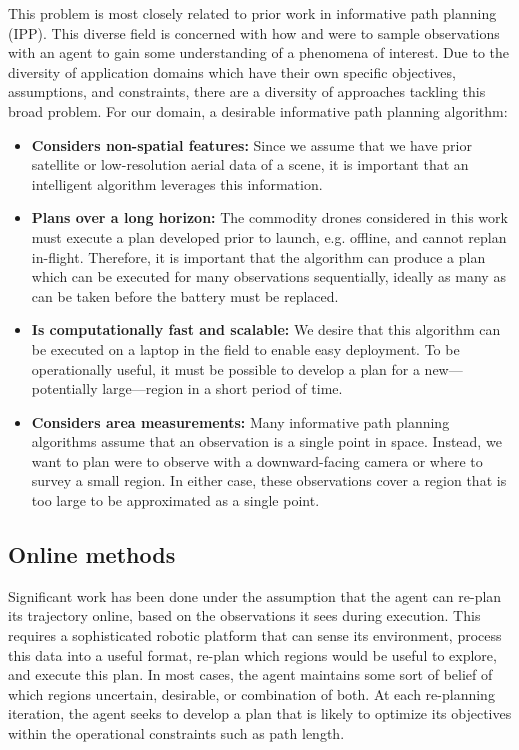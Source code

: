 This problem is most closely related to prior work in informative path planning (IPP). This diverse field is concerned with how and were to sample observations with an agent to gain some understanding of a phenomena of interest. Due to the diversity of application domains which have their own specific objectives, assumptions, and constraints, there are a diversity of approaches tackling this broad problem. For our domain, a desirable informative path planning algorithm:

\begin{itemize}
    \item \textbf{Considers non-spatial features:} Since we assume that we have prior satellite or low-resolution aerial data of a scene, it is important that an intelligent algorithm leverages this information.
    \item \textbf{Plans over a long horizon:} The commodity drones considered in this work must execute a plan developed prior to launch, e.g. offline, and cannot replan in-flight.
    Therefore, it is important that the algorithm can produce a plan which can be executed for many observations sequentially, ideally as many as can be taken before the battery must be replaced. 
    \item \textbf{Is computationally fast and scalable:} We desire that this algorithm can be executed on a laptop in the field to enable easy deployment.
    To be operationally useful, it must be possible to develop a plan for a new---potentially large---region in a short period of time.
    \item \textbf{Considers area measurements:} Many informative path planning algorithms assume that an observation is a single point in space. Instead, we want to plan were to observe with a downward-facing camera or where to survey a small region. In either case, these observations cover a region that is too large to be approximated as a single point.
\end{itemize}



\subsection{Online methods}

Significant work has been done under the assumption that the agent can re-plan its trajectory online, based on the observations it sees during execution. This requires a sophisticated robotic platform that can sense its environment, process this data into a useful format, re-plan which regions would be useful to explore, and execute this plan. In most cases, the agent maintains some sort of belief of which regions uncertain, desirable, or combination of both. At each re-planning iteration, the agent seeks to develop a plan that is likely to optimize its objectives within the operational constraints such as path length.

